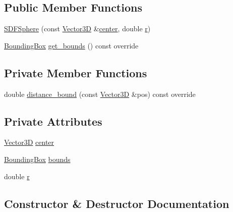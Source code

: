 \subsection*{Public Member Functions}
\begin{DoxyCompactItemize}
\item 
\mbox{\hyperlink{classSDFSphere_a578a9184a4902e2c8e32599a59b4ba95}{S\+D\+F\+Sphere}} (const \mbox{\hyperlink{classVector3D}{Vector3D}} \&\mbox{\hyperlink{classSDFSphere_ae84a69978c77f2220b7a5dde3694477a}{center}}, double \mbox{\hyperlink{classSDFSphere_a907d3a0d7b563b73e5ebc0f3e04d948e}{r}})
\item 
\mbox{\hyperlink{classBoundingBox}{Bounding\+Box}} \mbox{\hyperlink{classSDFSphere_a9a0e4c9feb32bcd2ce78a3027d3ce2ad}{get\+\_\+bounds}} () const override
\end{DoxyCompactItemize}
\subsection*{Private Member Functions}
\begin{DoxyCompactItemize}
\item 
double \mbox{\hyperlink{classSDFSphere_aba1d5f7d9f16ee7fd40c5dae5df467d1}{distance\+\_\+bound}} (const \mbox{\hyperlink{classVector3D}{Vector3D}} \&pos) const override
\end{DoxyCompactItemize}
\subsection*{Private Attributes}
\begin{DoxyCompactItemize}
\item 
\mbox{\hyperlink{classVector3D}{Vector3D}} \mbox{\hyperlink{classSDFSphere_ae84a69978c77f2220b7a5dde3694477a}{center}}
\item 
\mbox{\hyperlink{classBoundingBox}{Bounding\+Box}} \mbox{\hyperlink{classSDFSphere_a7df90cc239506488f1bb76cd5f78cdb3}{bounds}}
\item 
double \mbox{\hyperlink{classSDFSphere_a907d3a0d7b563b73e5ebc0f3e04d948e}{r}}
\end{DoxyCompactItemize}


\subsection{Constructor \& Destructor Documentation}
\mbox{\label{classSDFSphere_a578a9184a4902e2c8e32599a59b4ba95}} 
